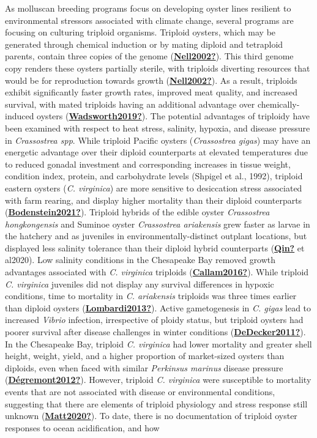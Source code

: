 \documentclass [11pt, proquest] {uwthesis}[2015/03/03]
\begin{document}
As molluscan breeding programs focus on developing oyster lines resilient to environmental stressors associated with climate change, several programs are focusing on culturing triploid organisms. Triploid oysters, which may be generated through chemical induction or by mating diploid and tetraploid parents, contain three copies of the genome (\protect\hyperlink{ref-Nell2002}{\textbf{Nell2002?}}). This third genome copy renders these oysters partially sterile, with triploids diverting resources that would be for reproduction towards growth (\protect\hyperlink{ref-Nell2002}{\textbf{Nell2002?}}). As a result, triploids exhibit significantly faster growth rates, improved meat quality, and increased survival, with mated triploids having an additional advantage over chemically-induced oysters (\protect\hyperlink{ref-Wadsworth2019}{\textbf{Wadsworth2019?}}). The potential advantages of triploidy have been examined with respect to heat stress, salinity, hypoxia, and disease pressure in \emph{Crassostrea spp}. While triploid Pacific oysters (\emph{Crassostrea gigas}) may have an energetic advantage over their diploid counterparts at elevated temperatures due to reduced gonadal investment and corresponding increases in tissue weight, condition index, protein, and carbohydrate levels (Shpigel et al., 1992), triploid eastern oysters (\emph{C. virginica}) are more sensitive to desiccation stress associated with farm rearing, and display higher mortality than their diploid counterparts (\protect\hyperlink{ref-Bodenstein2021}{\textbf{Bodenstein2021?}}). Triploid hybrids of the edible oyster \emph{Crassostrea hongkongensis} and Suminoe oyster \emph{Crassostrea ariakensis} grew faster as larvae in the hatchery and as juveniles in environmentally-distinct outplant locations, but displayed less salinity tolerance than their diploid hybrid counterparts (\protect\hyperlink{ref-Qin}{\textbf{Qin?}} et al2020). Low salinity conditions in the Chesapeake Bay removed growth advantages associated with \emph{C. virginica} triploids (\protect\hyperlink{ref-Callam2016}{\textbf{Callam2016?}}). While triploid \emph{C. virginica} juveniles did not display any survival differences in hypoxic conditions, time to mortality in \emph{C. ariakensis} triploids was three times earlier than diploid oysters (\protect\hyperlink{ref-Lombardi2013}{\textbf{Lombardi2013?}}). Active gametogenesis in \emph{C. gigas} lead to increased \emph{Vibrio} infection, irrespective of ploidy status, but triploid oysters had poorer survival after disease challenges in winter conditions (\protect\hyperlink{ref-DeDecker2011}{\textbf{DeDecker2011?}}). In the Chesapeake Bay, triploid \emph{C. virginica} had lower mortality and greater shell height, weight, yield, and a higher proportion of market-sized oysters than diploids, even when faced with similar \emph{Perkinsus marinus} disease pressure (\protect\hyperlink{ref-Duxe9gremont2012}{\textbf{Dégremont2012?}}). However, triploid \emph{C. virginica} were susceptible to mortality events that are not associated with disease or environmental conditions, suggesting that there are elements of triploid physiology and stress response still unknown (\protect\hyperlink{ref-Matt2020}{\textbf{Matt2020?}}). To date, there is no documentation of triploid oyster responses to ocean acidification, and how 
\end{document}
